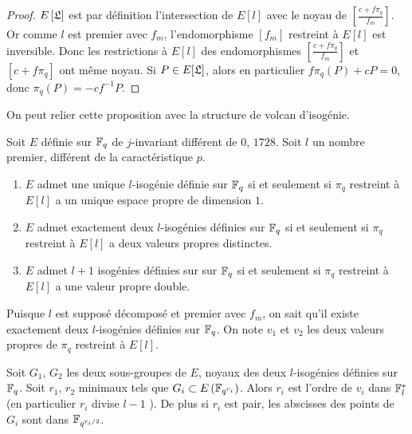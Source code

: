 \begin{proof}
	$E\left[ \mathfrak{L}\right]$ est par définition l'intersection de $E\left[ l\right] $ avec le noyau de $\left[\frac{c + f\pi_{q}}{f_{m}}\right]$. Or comme $l$ est premier avec $f_m$, l'endomorphisme $[f_m]$ restreint à $E[l]$ est inversible. Donc les restrictions à $E\left[ l\right]$ des endomorphismes $ \left[ \frac{c + f\pi_{q}}{f_{m}}\right]$ et $\left[ c + f\pi_{q}\right]$ ont même noyau. Si $P\in E[\mathfrak{L}]$, alors en particulier $f\pi_{q}(P) + cP = 0$, donc $\pi_{q}(P) = -cf^{-1}P$.
\end{proof}

On peut relier cette proposition avec la structure de volcan d'isogénie.

\begin{Prop}
	
	Soit $E$ définie sur $\mathbb{F}_{q}$ de $j$-invariant différent de $0$, $1728$. Soit $l$ un nombre premier, différent de la caractéristique $p$. 
	\begin{enumerate}
		\item $E$ admet une unique $l$-isogénie définie sur $\mathbb{F}_{q}$ si et seulement si $\pi_{q}$ restreint à $E[l]$ a un unique espace propre de dimension $1$.
		\item $E$ admet exactement deux $l$-isogénies définies sur $\mathbb{F}_{q}$ si et seulement si $\pi_{q}$ restreint à $E[l]$ a deux valeurs propres distinctes.
		\item $E$ admet $l+1$ isogénies définies sur sur $\mathbb{F}_{q}$ si et seulement si $\pi_{q}$ restreint à $E[l]$ a une valeur propre double.
	\end{enumerate}
	
\end{Prop}

Puisque $l$ est supposé décomposé et premier avec $f_{m}$, on sait qu'il existe exactement deux $l$-isogénies définies sur $\mathbb{F}_{q}$. On note $v_{1}$ et $v_{2}$ les deux valeurs propres de $\pi_{q}$ restreint à $E[l]$. 

\begin{Prop}
	Soit $G_{1}$, $G_{2}$ les deux sous-groupes de $E$, noyaux des deux $l$-isogénies définies sur $\mathbb{F}_{q}$. Soit $r_{1}$, $r_{2}$ minimaux tels que $G_{i}\subset E\left( \mathbb{F}_{q^{r_{i}}}\right) $. Alors $r_{i}$ est l'ordre de $v_{i}$ dans $\mathbb{F}_{l}^{*}$ (en particulier $r_{i}$ divise $l-1$ ). De plus si $r_{i}$ est pair, les abscisses des points de $G_{i}$ sont dans $\mathbb{F}_{q^{r_{i}/2}}$.
\end{Prop}


